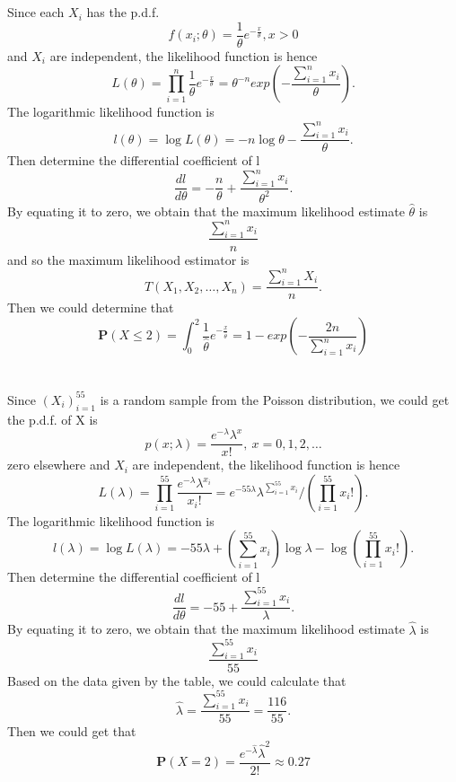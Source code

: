 \documentclass[10.5pt]{article}
\begin{document}
\section{}
Since each $X_i$ has the p.d.f. $$f(x_i;\theta)=\frac{1}{\theta}e^{-\frac{x}{\theta}},x>0$$\indent
and $X_i$ are independent, the likelihood function is hence $$L(\theta)=\prod_{i=1}^n\frac{1}{\theta}e^{-\frac{x}{\theta}}=\theta^{-n}exp\left(-\frac{\sum_{i=1}^nx_i}{\theta}\right).$$\indent
The logarithmic likelihood function is $$l(\theta)=\log L(\theta)=-n\log\theta-\frac{\sum_{i=1}^nx_i}{\theta}.$$\indent
Then determine the differential coefficient of l $$\frac{dl}{d\theta}=-\frac{n}{\theta}+\frac{\sum_{i=1}^nx_i}{\theta^2}.$$\indent
By equating it to zero, we obtain that the maximum likelihood estimate $\hat{\theta}$ is $$\frac{\sum_{i=1}^nx_i}{n}$$\indent
and so the maximum likelihood estimator is $$T(X_1,X_2,\dots,X_n)=\frac{\sum_{i=1}^nX_i}{n}.$$\indent
Then we could determine that $$\mathbf{P}(X\leqslant 2)=\int_0^2\frac{1}{\hat{\theta}}e^{-\frac{x}{\hat{\theta}}}=1-exp\left(-\frac{2n}{\sum_{i=1}^nx_i}\right)$$


\section{}
Since $(X_i)_{i=1}^{55}$ is a random sample from the Poisson distribution, we could get the p.d.f. of X is $$p(x;\lambda)=\frac{e^{-\lambda}\lambda^x}{x!},~x=0,1,2,\dots$$\indent
zero elsewhere and $X_i$ are independent, the likelihood function is hence $$L(\lambda)=\prod_{i=1}^{55}\frac{e^{-\lambda}\lambda^{x_i}}{x_i!}=e^{-55\lambda}\lambda^{\sum_{i=1}^{55}x_i}/(\prod_{i=1}^{55}x_i!).$$\indent
The logarithmic likelihood function is $$l(\lambda)=\log L(\lambda)=-55\lambda+(\sum_{i=1}^{55}x_i)\log\lambda-\log(\prod_{i=1}^{55}x_i!).$$\indent
Then determine the differential coefficient of l $$\frac{dl}{d\theta}=-55+\frac{\sum_{i=1}^{55}x_i}{\lambda}.$$\indent
By equating it to zero, we obtain that the maximum likelihood estimate $\hat{\lambda}$ is $$\frac{\sum_{i=1}^{55}x_i}{55}$$\indent
Based on the data given by the table, we could calculate that $$\hat{\lambda}=\frac{\sum_{i=1}^{55}x_i}{55}=\frac{116}{55}.$$\indent
Then we could get that $$\mathbf{P}(X=2)=\frac{e^{-\hat{\lambda}}\hat{\lambda}^2}{2!}\approx 0.27$$
\end{document}
